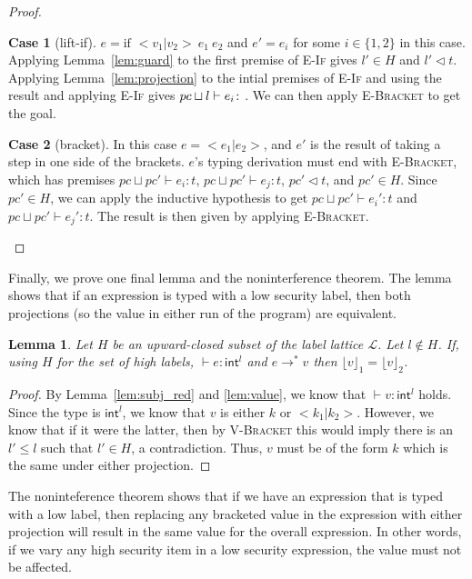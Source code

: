 \documentclass[a4paper,twocolumn]{article}
\newcommand{\typeRule}[3]{#1 \vdash #2 \colon #3}
\newcommand{\guards}[0]{\lhd}
\newcommand{\lift}[1]{\lfloor #1 \rfloor}
\theoremstyle{plain}
\newtheorem{lemma}{Lemma}
\theoremstyle{definition}
\newtheorem*{case}{Case}
\begin{document}
\begin{proof}
  \begin{case}[lift-if]
    $e = \text{if } <v_1 | v_2> \: e_1 \: e_2$ and $e' = e_i$ for some $i \in
    \{1, 2\}$ in this case.  Applying Lemma~\ref{lem:guard} to the first premise
    of \textsc{E-If} gives $l' \in H$ and $l' \guards t$.  Applying
    Lemma~\ref{lem:projection} to the intial premises of \textsc{E-If} and using
    the result and applying \textsc{E-If} gives $\typeRule{pc \sqcup l}{e_i}$.
    We can then apply \textsc{E-Bracket} to get the goal.
  \end{case}

  \begin{case}[bracket]
    In this case $e = <e_1 | e_2>$, and $e'$ is the result of taking a step in
    one side of the brackets.  $e$'s typing derivation must end with
    \textsc{E-Bracket}, which has premises $\typeRule{pc \sqcup pc'}{e_i}{t}$,
    $\typeRule{pc \sqcup pc'}{e_j}{t}$, $pc' \guards t$, and $pc' \in H$.  Since
    $pc' \in H$, we can apply the inductive hypothesis to get $\typeRule{pc
    \sqcup pc'}{e_i'}{t}$ and $\typeRule{pc \sqcup pc'}{e_j'}{t}$.  The result
    is then given by applying \textsc{E-Bracket}.
  \end{case}
\end{proof}

Finally, we prove one final lemma and the noninterference theorem.  The lemma
shows that if an expression is typed with a low security label, then both
projections (so the value in either run of the program) are equivalent.

\begin{lemma}
  \label{lem:final_support}
  Let $H$ be an upward-closed subset of the label lattice $\mathcal{L}$.  Let $l
  \not\in H$.  If, using $H$ for the set of high labels, $\typeRule{
  }{e}{\textsf{int}^l}$ and $e \to^* v$ then $\lift{v}_1 = \lift{v}_2$.
\end{lemma}
\begin{proof}
  By Lemma~\ref{lem:subj_red} and \ref{lem:value}, we know that $\typeRule{
  }{v}{\textsf{int}^l}$ holds.  Since the type is $\textsf{int}^l$, we know that
  $v$ is either $k$ or $< k_1 | k_2 >$.  However, we know that if it were the
  latter, then by \textsc{V-Bracket} this would imply there is an $l' \leq l$
  such that $l' \in H$, a contradiction.  Thus, $v$ must be of the form $k$
  which is the same under either projection.
\end{proof}

The noninteference theorem shows that if we have an expression that is typed
with a low label, then replacing any bracketed value in the expression with
either projection will result in the same value for the overall expression.  In
other words, if we vary any high security item in a low security expression, the
value must not be affected.
\end{document}
